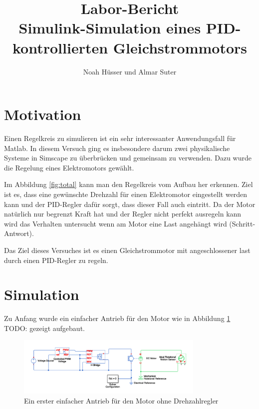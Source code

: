 \documentclass{fhnwreport} %
\title{%
  Labor-Bericht\\[2ex]
  Simulink-Simulation eines PID-kontrollierten Gleichstrommotors}
\author{%
  Noah Hüsser und Almar Suter}
\begin{document}
\maketitle

\tableofcontents

\section{Motivation}

Einen Regelkreis zu simulieren ist ein sehr interessanter Anwendungsfall für Matlab.
In diesem Versuch ging es insbesondere darum zwei physikalische Systeme in Simscape zu überbrücken und gemeinsam zu verwenden.
Dazu wurde die Regelung eines Elektromotors gewählt.

Im Abbildung \ref{fig:total} kann man den Regelkreis vom Aufbau her erkennen. Ziel ist es, dass eine gewünschte Drehzahl für einen Elektromotor eingestellt werden kann und der PID-Regler dafür sorgt, dass dieser Fall auch eintritt.
Da der Motor natürlich nur begrenzt Kraft hat und der Regler nicht perfekt ausregeln kann wird das Verhalten untersucht wenn am Motor eine Last angehängt wird (Schritt-Antwort).

Das Ziel dieses Versuches ist es einen Gleichstrommotor mit angeschlossener last durch einen PID-Regler zu regeln.

\section{Simulation}

Zu Anfang wurde ein einfacher Antrieb für den Motor wie in Abbildung \ref{fig:circuit_simple} TODO: gezeigt aufgebaut.

\begin{figure}
\begin{center}
\includegraphics[width=0.8\textwidth]{circuit_simple}
\caption{Ein erster einfacher Antrieb für den Motor ohne Drehzahlregler}
\label{fig:circuit_simple}
\end{center}
\end{figure}
\end{document}
